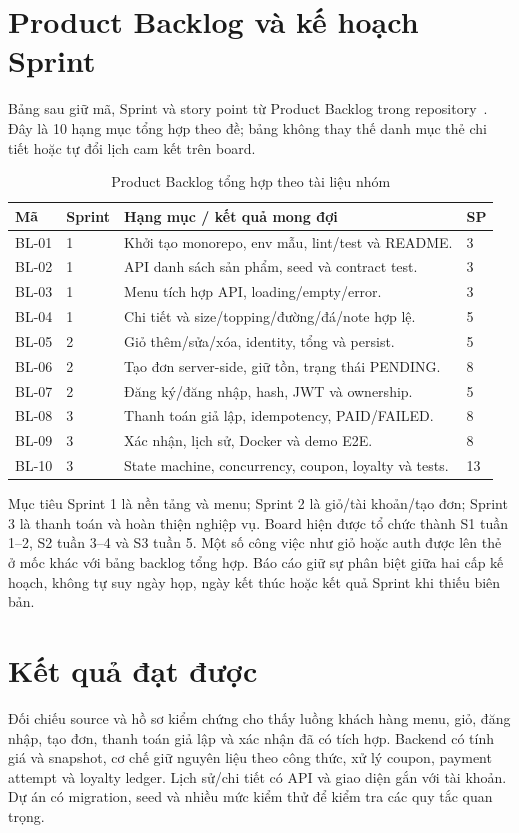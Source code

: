 \section{Product Backlog và kế hoạch Sprint}
Bảng sau giữ mã, Sprint và story point từ Product Backlog trong
repository~\cite{backlog}. Đây là 10 hạng mục tổng hợp theo đề; bảng
không thay thế danh mục thẻ chi tiết hoặc tự đổi lịch cam kết trên board.
\begin{table}[H]
\centering\small{}
\caption{Product Backlog tổng hợp theo tài liệu nhóm}\label{tab:backlog}
\begin{tabularx}{\textwidth}{@{}L{0.12\textwidth}L{0.09\textwidth}YL{0.06\textwidth}@{}}
\toprule\textbf{Mã} & \textbf{Sprint} & \textbf{Hạng mục / kết quả mong đợi} & \textbf{SP} \\\midrule

BL-01 & 1 & Khởi tạo monorepo, env mẫu, lint/test và README. & 3 \\
BL-02 & 1 & API danh sách sản phẩm, seed và contract test. & 3 \\
BL-03 & 1 & Menu tích hợp API, loading/empty/error. & 3 \\
BL-04 & 1 & Chi tiết và size/topping/đường/đá/note hợp lệ. & 5 \\
BL-05 & 2 & Giỏ thêm/sửa/xóa, identity, tổng và persist. & 5 \\
BL-06 & 2 & Tạo đơn server-side, giữ tồn, trạng thái PENDING. & 8 \\
BL-07 & 2 & Đăng ký/đăng nhập, hash, JWT và ownership. & 5 \\
BL-08 & 3 & Thanh toán giả lập, idempotency, PAID/FAILED. & 8 \\
BL-09 & 3 & Xác nhận, lịch sử, Docker và demo E2E. & 8 \\
BL-10 & 3 & State machine, concurrency, coupon, loyalty và tests. & 13 \\
\bottomrule
\end{tabularx}
\end{table}

Mục tiêu Sprint 1 là nền tảng và menu; Sprint 2 là giỏ/tài khoản/tạo đơn;
Sprint 3 là thanh toán và hoàn thiện nghiệp vụ. Board hiện được tổ chức
thành S1 tuần 1--2, S2 tuần 3--4 và S3 tuần 5. Một số công việc như giỏ
hoặc auth được lên thẻ ở mốc khác với bảng backlog tổng hợp. Báo cáo giữ
sự phân biệt giữa hai cấp kế hoạch, không tự suy ngày họp, ngày kết thúc
hoặc kết quả Sprint khi thiếu biên bản.

\section{Kết quả đạt được}
Đối chiếu source và hồ sơ kiểm chứng cho thấy luồng khách hàng menu,
giỏ, đăng nhập, tạo đơn, thanh toán giả lập và xác nhận đã có tích hợp.
Backend có tính giá và snapshot, cơ chế giữ nguyên liệu theo công thức,
xử lý coupon, payment attempt và loyalty ledger. Lịch sử/chi tiết có API
và giao diện gắn với tài khoản. Dự án có migration, seed và nhiều mức
kiểm thử để kiểm tra các quy tắc quan trọng.

